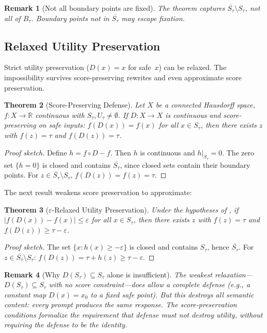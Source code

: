 \documentclass[11pt]{article}
\newtheorem{theorem}{Theorem}[section]
\newtheorem{remark}[theorem]{Remark}
\newcommand{\R}{\mathbb{R}}
\newcommand{\cl}[1]{\overline{#1}}
\begin{document}
\begin{remark}[Not all boundary points are fixed]
The theorem captures $\cl{S_\tau} \setminus S_\tau$, not all of
$B_\tau$. Boundary points not in $\cl{S_\tau}$ may escape fixation.
\end{remark}


\subsection{Relaxed Utility Preservation}
\label{sec:relaxed}

Strict utility preservation ($D(x) = x$ for safe~$x$) can be
relaxed. The impossibility survives score-preserving rewrites and
even approximate score preservation.

\begin{theorem}[Score-Preserving Defense]
\label{thm:score-preserving}
Let $X$ be a connected Hausdorff space, $f\colon X\to\R$ continuous
with $S_\tau, U_\tau \neq \emptyset$. If $D\colon X \to X$ is
continuous and \emph{score-preserving on safe inputs}:
$f(D(x)) = f(x)$ for all $x \in S_\tau$, then there exists $z$ with
$f(z) = \tau$ and $f(D(z)) = \tau$.
\end{theorem}

\begin{proof}[Proof sketch]
Define $h = f \circ D - f$. Then $h$ is continuous and $h|_{S_\tau} = 0$.
The zero set $\{h = 0\}$ is closed and contains $\cl{S_\tau}$, since closed sets contain their boundary points. For
$z \in \cl{S_\tau} \setminus S_\tau$, $f(D(z)) = f(z) = \tau$.
\end{proof}

The next result weakens score preservation to approximate:

\begin{theorem}[$\varepsilon$-Relaxed Utility Preservation]
\label{thm:eps-relaxed}
Under the hypotheses of , if
$|f(D(x)) - f(x)| \leq \varepsilon$ for all $x \in S_\tau$, then
there exists $z$ with $f(z) = \tau$ and
$f(D(z)) \geq \tau - \varepsilon$.
\end{theorem}

\begin{proof}[Proof sketch]
The set $\{x : h(x) \geq -\varepsilon\}$ is closed and contains
$S_\tau$, hence $\cl{S_\tau}$. For
$z \in \cl{S_\tau} \setminus S_\tau$:
$f(D(z)) = \tau + h(z) \geq \tau - \varepsilon$.
\end{proof}


\begin{remark}[Why $D(S_\tau) \subseteq S_\tau$ alone is insufficient]
\label{rem:safe-preserving-escape}
The weakest relaxation---$D(S_\tau) \subseteq S_\tau$ with no score
constraint---does allow a complete defense (e.g., a constant map
$D(x) = x_0$ to a fixed safe point). But this destroys all semantic
content: every prompt produces the same response. The score-preservation
conditions formalize the requirement that defense must not destroy
utility, without requiring the defense to be the identity.
\end{remark}
\end{document}
